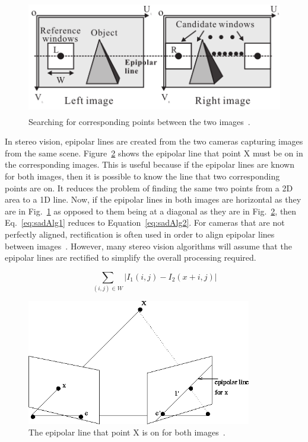 \begin{figure}[h]
\begin{center}
	\includegraphics[height=50mm]{figures/sadCorrespondingWindows.png}
	\captionfonts
	\caption{Searching for corresponding points between the two images~\cite{sadParallel}.}
	\label{fig:sad_corr}
\end{center}
\end{figure}

In stereo vision, epipolar lines are created from the two cameras capturing images from the same scene. Figure~\ref{fig:epipolar} shows the epipolar line that point X must be on in the corresponding images. This is useful because if the epipolar lines are known for both images, then it is possible to know the line that two corresponding points are on. It reduces the problem of finding the same two points from a 2D area to a 1D line. Now, if the epipolar lines in both images are horizontal as they are in Fig.~\ref{fig:sad_corr} as opposed to them being at a diagonal as they are in Fig.~\ref{fig:epipolar}, then Eq.~\ref{eq:sadAlg1} reduces to Equation~\ref{eq:sadAlg2}. For cameras that are not perfectly aligned, rectification is often used in order to align epipolar lines between images~\cite{rectification}. However, many stereo vision algorithms will assume that the epipolar lines are rectified to simplify the overall processing required.

\begin{equation}
	\sum\limits_{(i,j)\in W}\left| I_{1}(i,j)-I_{2}(x+i,j) \right|
	\label{eq:sadAlg2}
\end{equation}

\begin{figure}[h]
\begin{center}
	\includegraphics[height=55mm]{figures/epipolar.png}
	\captionfonts
	\caption{The epipolar line that point X is on for both images~\cite{epipolar}.}
	\label{fig:epipolar}
\end{center}
\end{figure}

